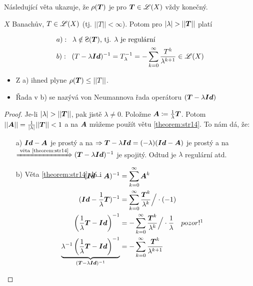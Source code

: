 Následující věta ukazuje, že $\rho(\boldsymbol{T})$ je pro $\boldsymbol{T} \in \mathscr{L}(X)$ vždy konečný.
\begin{theorem}
\label{veta_neumanovarada}
\label{theorem:str26}
    $X$ Banachův, $T\in \mathscr{L}(X)$ (tj. $||T||<\infty$). Potom pro $|\lambda|>||\map T||$ platí

\begin{align*}
        &a):\;\; \lambda \notin \Sp(\map T)\text{, tj. } \lambda \text{ je regulární}  \\
        &b):\;\; (T-\lambda\map{Id})^{-1}=T_\lambda^{-1}=-\sum\limits_{k=0}^\infty\frac{T^k}{\lambda^{k+1}}\in\lin(X) 
\end{align*}
\end{theorem}

\begin{remark} 
\begin{itemize}
    \item Z a) ihned plyne $\rho(\boldsymbol{T}) \leq ||T||$.
    \item Řada v b) se nazývá von Neumannova řada operátoru $(\boldsymbol{T}-\lambda \boldsymbol{Id})$ %
\end{itemize}
\end{remark}
\begin{proof}
    Je-li $|\lambda|>||\map T||$, pak jistě $\lambda\neq0$. Položme $\boldsymbol{A}\coloneqq\frac{1}{\lambda}\boldsymbol{T}$. Potom $||\boldsymbol{A}||=\frac{1}{|\lambda|}||\boldsymbol{T}||<1$ a na $\boldsymbol{A}$ můžeme použít větu \ref{theorem:str14}. To nám dá, že:
    \begin{enumerate}[label*=.]
        \item[a)] $\boldsymbol{Id}-\boldsymbol{A}$ je prostý a na $\Rightarrow \boldsymbol{T}-\lambda\boldsymbol{Id}=(-\lambda)(\boldsymbol{Id}-\boldsymbol{A})$ je prostý a na $\xRightarrow{\text{ věta \ref{theorem:str14}}} (\boldsymbol{T}-\lambda\boldsymbol{Id} )^{-1}$ je spojitý. Odtud je $\lambda$ regulární atd.
        \item[b)] Věta \ref{theorem:str14} dá i 
        \begin{align*}
            \\[-4em]
            (\map{Id}-\map A)^{-1}&=\sum_{k=0}^\infty \map A^k\\
            (\map{Id}-\frac{1}{\lambda} \map T)^{-1}&=\sum_{k=0}^\infty\frac{\map T^k}{\lambda^k} \Big/ \cdot (-1)\\
            \left(\frac{1}{\lambda}\map T-\map{Id} \right)^{-1}&=-\sum_{k=0}^\infty\frac{\map T^k}{\lambda^k} \Big/\cdot \frac{1}{\lambda} \quad pozor!\footnotemark\\
            \underbrace{\lambda^{-1}\left(\frac{1}{\lambda}\map T-\map{Id} \right)^{-1}}_{(\map T-\lambda \map{Id})^{-1}}&=-\sum_{k=0}^\infty\frac{\map T^k}{\lambda^{k+1}}
        \end{align*}
      \end{enumerate}
\end{proof}
